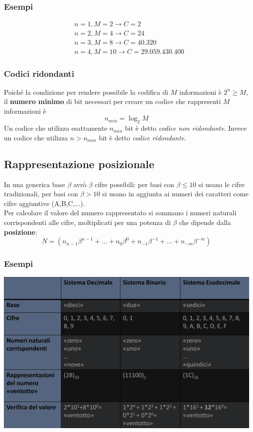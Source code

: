 \documentclass{article}
\begin{document}
\subsubsection*{Esempi}
\begin{align*}
&n=1, M=2 \rightarrow C = 2\\
&n=2, M=4 \rightarrow C = 24\\
&n=3, M=8 \rightarrow C = 40.320\\
&n=4, M=10 \rightarrow C = 29.059.430.400
\end{align*}
\subsubsection{Codici ridondanti}
Poiché la condizione per rendere possibile la codifica di $M$ informazioni è $2^n \geq M$, il \textbf{numero minimo} di bit necessari per creare un codice che rappresenti $M$ informazioni è
$$n_{min} = \log_2 M $$
Un codice che utilizza esattamente $n_{min}$ bit è detto \textit{codice non ridondante}. Invece un codice che utilizza $n > n_{min}$ bit è detto \textit{codice ridondante}.
\subsection{Rappresentazione posizionale}
In una generica base $\beta$ avrò $\beta$ cifre possibili: per basi con $\beta \leq 10$ si usano le cifre tradizionali, per basi con $\beta > 10$ si usano in aggiunta ai numeri dei caratteri come cifre aggiuntive (A,B,C,...).\\
Per calcolare il valore del numero rappresentato si sommano i numeri naturali corrispondenti alle cifre, moltiplicati per una potenza di $\beta$ che dipende dalla \textbf{posizione}:
$$ N = (n_{n-1}\beta ^{n-1} + ... + n_0\beta^0 + n_{-1}\beta^{-1} + ... + n_{-m}\beta^{-m})  $$
\subsubsection*{Esempi}
\begin{center}
    \includegraphics[scale=0.38]{espos.png}
\end{center}
\end{document}
